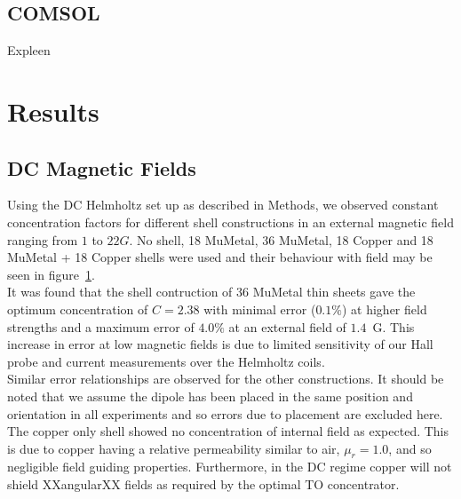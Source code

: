 \documentclass[11pt]{iopart}
\begin{document}
\subsection{COMSOL}
Expleen

\section{Results}
\subsection{DC Magnetic Fields}
\begin{figure}
  \caption{}
  \label{fig:DC_graph}
\end{figure}

Using the DC Helmholtz set up as described in Methods, we observed
constant concentration factors for different shell constructions in an
external magnetic field ranging from $1$ to $22 G$. No shell, 18
MuMetal, 36 MuMetal, 18 Copper and 18 MuMetal + 18 Copper shells were
used and their behaviour with field may be seen in
figure~\ref{fig:DC_graph}.\\ It was found that the shell contruction of 36
MuMetal thin sheets gave the optimum concentration of $C = 2.38$ with
minimal error ($0.1\%$) at higher field strengths and a maximum error
of $4.0\%$ at an external field of $1.4$~G. This increase in error at
low magnetic fields is due to limited sensitivity of our Hall probe
and current measurements over the Helmholtz coils.\\ Similar error
relationships are observed for the other constructions. It should be
noted that we assume the dipole has been placed in the same position
and orientation in all experiments and so errors due to placement are
excluded here.\\ The copper only shell showed no concentration of
internal field as expected. This is due to copper having a relative
permeability similar to air, $\mu_r = 1.0$, and so negligible field
guiding properties. Furthermore, in the DC regime copper will not
shield XXangularXX fields as required by the optimal TO
concentrator.\\
\end{document}
